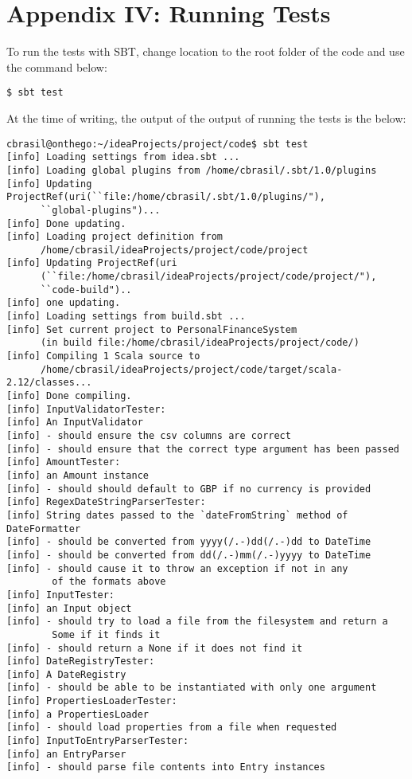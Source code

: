 \section{Appendix IV: Running Tests} \label{appendix4}

To run the tests with SBT, change location to the root folder of the code and
use the command below:
\begin{lstlisting}
$ sbt test
\end{lstlisting}

At the time of writing, the output of the output of running the tests is the below:
\begin{lstlisting}
cbrasil@onthego:~/ideaProjects/project/code$ sbt test
[info] Loading settings from idea.sbt ...
[info] Loading global plugins from /home/cbrasil/.sbt/1.0/plugins
[info] Updating ProjectRef(uri(``file:/home/cbrasil/.sbt/1.0/plugins/"),
      ``global-plugins")...
[info] Done updating.
[info] Loading project definition from 
      /home/cbrasil/ideaProjects/project/code/project
[info] Updating ProjectRef(uri
      (``file:/home/cbrasil/ideaProjects/project/code/project/"),
      ``code-build")..
[info] one updating.
[info] Loading settings from build.sbt ...
[info] Set current project to PersonalFinanceSystem 
      (in build file:/home/cbrasil/ideaProjects/project/code/)
[info] Compiling 1 Scala source to 
      /home/cbrasil/ideaProjects/project/code/target/scala-2.12/classes...
[info] Done compiling.
[info] InputValidatorTester:
[info] An InputValidator
[info] - should ensure the csv columns are correct
[info] - should ensure that the correct type argument has been passed
[info] AmountTester:
[info] an Amount instance
[info] - should should default to GBP if no currency is provided
[info] RegexDateStringParserTester:
[info] String dates passed to the `dateFromString` method of DateFormatter
[info] - should be converted from yyyy(/.-)dd(/.-)dd to DateTime
[info] - should be converted from dd(/.-)mm(/.-)yyyy to DateTime
[info] - should cause it to throw an exception if not in any
        of the formats above
[info] InputTester:
[info] an Input object
[info] - should try to load a file from the filesystem and return a 
        Some if it finds it
[info] - should return a None if it does not find it
[info] DateRegistryTester:
[info] A DateRegistry
[info] - should be able to be instantiated with only one argument
[info] PropertiesLoaderTester:
[info] a PropertiesLoader
[info] - should load properties from a file when requested
[info] InputToEntryParserTester:
[info] an EntryParser
[info] - should parse file contents into Entry instances

\end{lstlisting}
